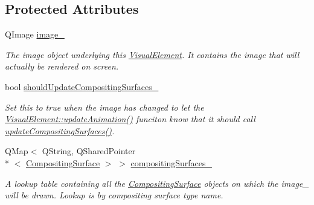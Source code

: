 \subsection*{Protected Attributes}
\begin{DoxyCompactItemize}
\item 
\hypertarget{struct_picto_1_1_visual_element_a0f8dcd85954853a75303b288ab688363}{Q\-Image \hyperlink{struct_picto_1_1_visual_element_a0f8dcd85954853a75303b288ab688363}{image\-\_\-}}\label{struct_picto_1_1_visual_element_a0f8dcd85954853a75303b288ab688363}

\begin{DoxyCompactList}\small\item\em The image object underlying this \hyperlink{struct_picto_1_1_visual_element}{Visual\-Element}. It contains the image that will actually be rendered on screen. \end{DoxyCompactList}\item 
\hypertarget{struct_picto_1_1_visual_element_aff8a9bd2c730821317cde3409803bc0e}{bool \hyperlink{struct_picto_1_1_visual_element_aff8a9bd2c730821317cde3409803bc0e}{should\-Update\-Compositing\-Surfaces\-\_\-}}\label{struct_picto_1_1_visual_element_aff8a9bd2c730821317cde3409803bc0e}

\begin{DoxyCompactList}\small\item\em Set this to true when the image has changed to let the \hyperlink{struct_picto_1_1_visual_element_a598c8f6e33c58b85b80197e3743b0e91}{Visual\-Element\-::update\-Animation()} funciton know that it should call \hyperlink{struct_picto_1_1_visual_element_a7aeaf89e302d12a27338ec1d2c1fa028}{update\-Compositing\-Surfaces()}. \end{DoxyCompactList}\item 
\hypertarget{struct_picto_1_1_visual_element_a47744977bc4e2b72555e2149a4015d36}{Q\-Map$<$ Q\-String, Q\-Shared\-Pointer\\*
$<$ \hyperlink{struct_picto_1_1_compositing_surface}{Compositing\-Surface} $>$ $>$ \hyperlink{struct_picto_1_1_visual_element_a47744977bc4e2b72555e2149a4015d36}{compositing\-Surfaces\-\_\-}}\label{struct_picto_1_1_visual_element_a47744977bc4e2b72555e2149a4015d36}

\begin{DoxyCompactList}\small\item\em A lookup table containing all the \hyperlink{struct_picto_1_1_compositing_surface}{Compositing\-Surface} objects on which the image\-\_\- will be drawn. Lookup is by compositing surface type name. \end{DoxyCompactList}\end{DoxyCompactItemize}
